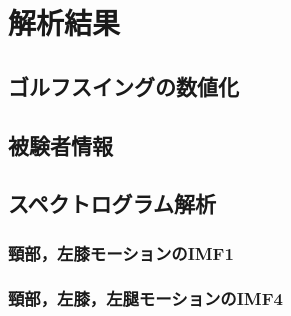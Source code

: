 \chapter{解析結果}
\section{ゴルフスイングの数値化}

\section{被験者情報}

\section{スペクトログラム解析}
\subsection{頸部，左膝モーションのIMF1}
\subsection{頸部，左膝，左腿モーションのIMF4}